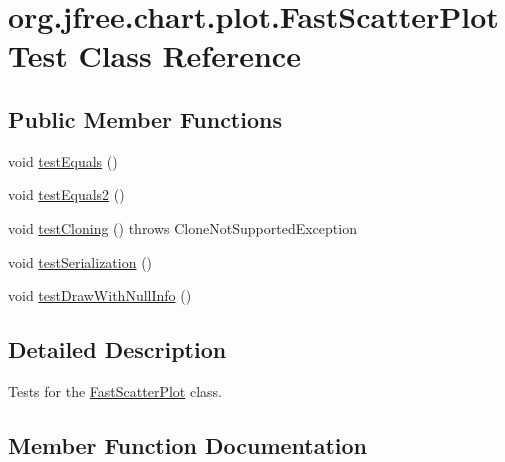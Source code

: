 \hypertarget{classorg_1_1jfree_1_1chart_1_1plot_1_1_fast_scatter_plot_test}{}\section{org.\+jfree.\+chart.\+plot.\+Fast\+Scatter\+Plot\+Test Class Reference}
\label{classorg_1_1jfree_1_1chart_1_1plot_1_1_fast_scatter_plot_test}
\subsection*{Public Member Functions}
\begin{DoxyCompactItemize}
\item 
void \mbox{\hyperlink{classorg_1_1jfree_1_1chart_1_1plot_1_1_fast_scatter_plot_test_a2ed4a3e42c78fa19fc20e4f2e06904b8}{test\+Equals}} ()
\item 
void \mbox{\hyperlink{classorg_1_1jfree_1_1chart_1_1plot_1_1_fast_scatter_plot_test_a0d635140cf5f820b69d5e116047937a7}{test\+Equals2}} ()
\item 
void \mbox{\hyperlink{classorg_1_1jfree_1_1chart_1_1plot_1_1_fast_scatter_plot_test_ad26a2f616cc3b6d4b20eedc79d4b79df}{test\+Cloning}} ()  throws Clone\+Not\+Supported\+Exception 
\item 
void \mbox{\hyperlink{classorg_1_1jfree_1_1chart_1_1plot_1_1_fast_scatter_plot_test_aa2e90ef51aeff4b865823824d5622721}{test\+Serialization}} ()
\item 
void \mbox{\hyperlink{classorg_1_1jfree_1_1chart_1_1plot_1_1_fast_scatter_plot_test_a5e84c0048533c83b387e4f62830a370c}{test\+Draw\+With\+Null\+Info}} ()
\end{DoxyCompactItemize}


\subsection{Detailed Description}
Tests for the \mbox{\hyperlink{classorg_1_1jfree_1_1chart_1_1plot_1_1_fast_scatter_plot}{Fast\+Scatter\+Plot}} class. 

\subsection{Member Function Documentation}
\mbox{\label{classorg_1_1jfree_1_1chart_1_1plot_1_1_fast_scatter_plot_test_ad26a2f616cc3b6d4b20eedc79d4b79df}} 
